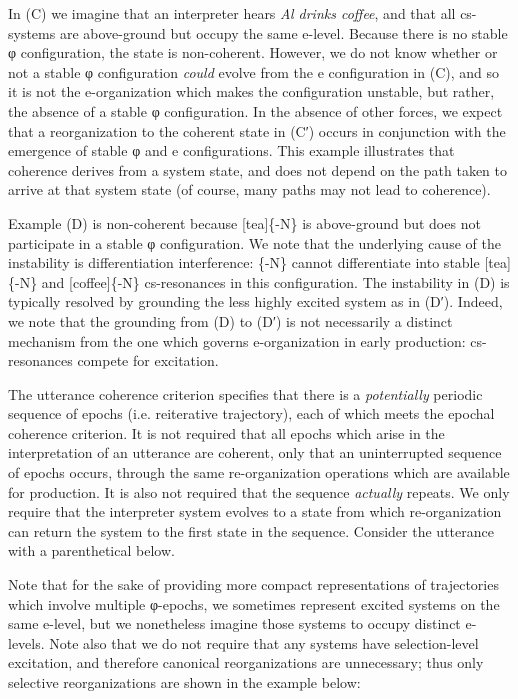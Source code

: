   In (C) we imagine that an interpreter hears \textit{Al drinks coffee}, and that all cs-systems are above-ground but occupy the same e-level. Because there is no stable φ configuration, the state is non-coherent. However, we do not know whether or not a stable φ configuration \textit{could} evolve from the e configuration in (C), and so it is not the e-organization which makes the configuration unstable, but rather, the absence of a stable φ configuration. In the absence of other forces, we expect that a reorganization to the coherent state in (C′) occurs in conjunction with the emergence of stable φ and e configurations. This example illustrates that coherence derives from a system state, and does not depend on the path taken to arrive at that system state (of course, many paths may not lead to coherence). 

  Example (D) is non-coherent because [tea]\{-N\} is above-ground but does not participate in a stable φ configuration. We note that the underlying cause of the instability is differentiation interference: \{-N\} cannot differentiate into stable [tea]\{-N\} and [coffee]\{-N\} cs-resonances in this configuration. The instability in (D) is typically resolved by grounding the less highly excited system as in (D′). Indeed, we note that the grounding from (D) to (D′) is not necessarily a distinct mechanism from the one which governs e-organization in early production: cs-resonances compete for excitation.

The utterance coherence criterion specifies that there is a \textit{potentially} periodic sequence of epochs (i.e. reiterative trajectory), each of which meets the epochal coherence criterion. It is not required that all epochs which arise in the interpretation of an utterance are coherent, only that an uninterrupted sequence of epochs occurs, through the same re-organization operations which are available for production. It is also not required that the sequence \textit{actually} repeats. We only require that the interpreter system evolves to a state from which re-organization can return the system to the first state in the sequence. Consider the utterance with a parenthetical below. 

  Note that for the sake of providing more compact representations of trajectories which involve multiple φ-epochs, we sometimes represent excited systems on the same e-level, but we nonetheless imagine those systems to occupy distinct e-levels. Note also that we do not require that any systems have selection-level excitation, and therefore canonical reorganizations are unnecessary; thus only selective reorganizations are shown in the example below:

